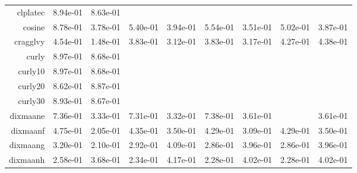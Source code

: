 \begin{tabular}{rrrrrrrrr}
  clplatec &  8.94e-01 &  8.63e-01 & \cellcolor{black}{\color{white}{ 8.85e-01}} & \cellcolor{black}{\color{white}{ 8.64e-01}} & \cellcolor{black}{\color{white}{ 8.95e-01}} & \cellcolor{black}{\color{white}{ 8.71e-01}} & \cellcolor{black}{\color{white}{ 8.98e-01}} & \cellcolor{black}{\color{white}{ 8.96e-01}} \\
  cosine &  8.78e-01 &  3.78e-01 &  5.40e-01 &  3.94e-01 &  5.54e-01 &  3.51e-01 &  5.02e-01 &  3.87e-01 \\
  cragglvy &  4.54e-01 &  1.48e-01 &  3.83e-01 &  3.12e-01 &  3.83e-01 &  3.17e-01 &  4.27e-01 &  4.38e-01 \\
  curly &  8.97e-01 &  8.68e-01 & \cellcolor{black}{\color{white}{ 8.98e-01}} & \cellcolor{black}{\color{white}{ 8.59e-01}} & \cellcolor{black}{\color{white}{ 8.98e-01}} & \cellcolor{black}{\color{white}{ 8.80e-01}} & \cellcolor{black}{\color{white}{ 8.97e-01}} & \cellcolor{black}{\color{white}{ 8.85e-01}} \\
  curly10 &  8.97e-01 &  8.68e-01 & \cellcolor{black}{\color{white}{ 8.95e-01}} & \cellcolor{black}{\color{white}{ 8.90e-01}} & \cellcolor{black}{\color{white}{ 8.82e-01}} & \cellcolor{black}{\color{white}{ 8.80e-01}} & \cellcolor{black}{\color{white}{ 8.77e-01}} & \cellcolor{black}{\color{white}{ 7.51e-01}} \\
  curly20 &  8.62e-01 &  8.87e-01 & \cellcolor{black}{\color{white}{ 8.78e-01}} & \cellcolor{black}{\color{white}{ 8.86e-01}} & \cellcolor{black}{\color{white}{ 8.89e-01}} & \cellcolor{black}{\color{white}{ 8.84e-01}} & \cellcolor{black}{\color{white}{ 8.20e-01}} & \cellcolor{black}{\color{white}{ 8.75e-01}} \\
  curly30 &  8.93e-01 &  8.67e-01 & \cellcolor{black}{\color{white}{ 8.97e-01}} & \cellcolor{black}{\color{white}{ 8.88e-01}} & \cellcolor{black}{\color{white}{ 8.90e-01}} & \cellcolor{black}{\color{white}{ 8.83e-01}} & \cellcolor{black}{\color{white}{ 8.74e-01}} & \cellcolor{black}{\color{white}{ 8.74e-01}} \\
  dixmaane &  7.36e-01 &  3.33e-01 &  7.31e-01 &  3.32e-01 &  7.38e-01 &  3.61e-01 & \cellcolor{black}{\color{white}{ 6.88e-01}} &  3.61e-01 \\
  dixmaanf &  4.75e-01 &  2.05e-01 &  4.35e-01 &  3.50e-01 &  4.29e-01 &  3.09e-01 &  4.29e-01 &  3.50e-01 \\
  dixmaang &  3.20e-01 &  2.10e-01 &  2.92e-01 &  4.09e-01 &  2.86e-01 &  3.96e-01 &  2.86e-01 &  3.96e-01 \\
  dixmaanh &  2.58e-01 &  3.68e-01 &  2.34e-01 &  4.17e-01 &  2.28e-01 &  4.02e-01 &  2.28e-01 &  4.02e-01 \\

\end{tabular}
